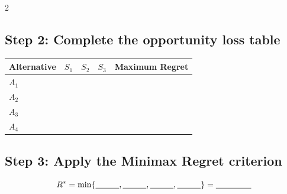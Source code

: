 \begin{multicols}{2}
	\subsection*{Step 2: Complete the opportunity loss table}
	
	\begin{center}
		\renewcommand{\arraystretch}{1.5}
		\small
		\begin{tabular}{lcccc}
			\toprule
			Alternative & $S_1$ & $S_2$ & $S_3$ & Maximum Regret \\
			\midrule
			$A_1$ &
			\underline{\hspace{1.1cm}} &
			\underline{\hspace{1.1cm}} &
			\underline{\hspace{1.1cm}} &
			\underline{\hspace{1.1cm}} \\[3pt]
			
			$A_2$ &
			\underline{\hspace{1.1cm}} &
			\underline{\hspace{1.1cm}} &
			\underline{\hspace{1.1cm}} &
			\underline{\hspace{1.1cm}} \\[3pt]
			
			$A_3$ &
			\underline{\hspace{1.1cm}} &
			\underline{\hspace{1.1cm}} &
			\underline{\hspace{1.1cm}} &
			\underline{\hspace{1.1cm}} \\[3pt]
			
			$A_4$ &
			\underline{\hspace{1.1cm}} &
			\underline{\hspace{1.1cm}} &
			\underline{\hspace{1.1cm}} &
			\underline{\hspace{1.1cm}} \\
			\bottomrule
		\end{tabular}
	\end{center}
	
	\subsection*{Step 3: Apply the Minimax Regret criterion}
	
	\[
	R^*
	=
	\min\{
	\underline{\hspace{1cm}},
	\underline{\hspace{1cm}},
	\underline{\hspace{1cm}},
	\underline{\hspace{1cm}}
	\}
	=
	\underline{\hspace{1.5cm}}
	\]
	

\end{multicols}
